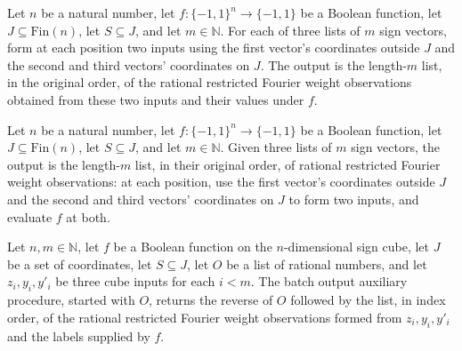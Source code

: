 \begin{definition}
\label{FABL.restrictedFourierWeightObservationBatchOutputAux}
\leanok
{}
Let $n$ be a natural number, let $f:\{−1,1\}^n\to\{−1,1\}$ be a Boolean function, let
$J\subseteq\mathrm{Fin}(n)$, let $S\subseteq J$, and let $m\in\mathbb N$. For each of
three lists of $m$ sign vectors, form at each position two inputs using the first
vector's coordinates outside $J$ and the second and third vectors' coordinates on $J$.
The output is the length-$m$ list, in the original order, of the rational restricted
Fourier weight observations obtained from these two inputs and their values under $f$.
\end{definition}

\begin{definition}
\label{FABL.restrictedFourierWeightObservationBatchOutput}
\leanok
{}
Let $n$ be a natural number, let $f:\{−1,1\}^n\to\{−1,1\}$ be a Boolean function, let
$J\subseteq\mathrm{Fin}(n)$, let $S\subseteq J$, and let $m\in\mathbb N$. Given three
lists of $m$ sign vectors, the output is the length-$m$ list, in their original order,
of rational restricted Fourier weight observations: at each position, use the first
vector's coordinates outside $J$ and the second and third vectors' coordinates on $J$ to
form two inputs, and evaluate $f$ at both.
\end{definition}

\begin{theorem}
\label{FABL.restrictedFourierWeightObservationBatchOutputAux_eq_append_ofFn}
\leanok
{}
Let $n,m\in\mathbb N$, let $f$ be a Boolean function on the $n$-dimensional sign cube,
let $J$ be a set of coordinates, let $S\subseteq J$, let $O$ be a list of rational
numbers, and let $z_i,y_i,y'_i$ be three cube inputs for each $i<m$. The batch output
auxiliary procedure, started with $O$, returns the reverse of $O$ followed by the list,
in index order, of the rational restricted Fourier weight observations formed from
$z_i,y_i,y'_i$ and the labels supplied by $f$.
\end{theorem}

